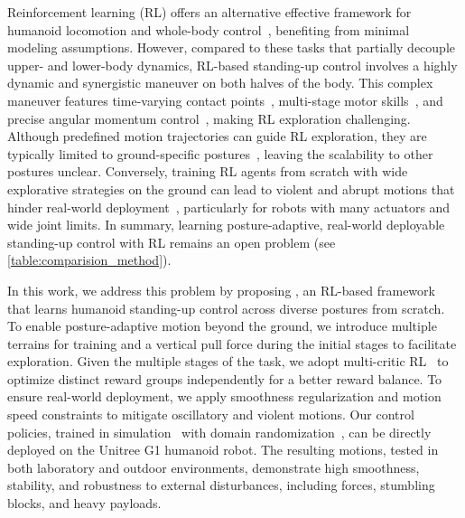 Reinforcement learning (RL) offers an alternative effective framework for humanoid locomotion and whole-body control~\cite{Peng2022ASE,He2024OmniH2OUA,Cheng2024ExpressiveWC,Zhang2024WoCoCoLW}, benefiting from minimal modeling assumptions. However, compared to these tasks that partially decouple upper- and lower-body dynamics, RL-based standing-up control involves a highly dynamic and synergistic maneuver on both halves of the body. This complex maneuver features time-varying contact points~\cite{kanehiro2003first}, multi-stage motor skills~\cite{luo2014multi}, and precise angular momentum control~\cite{Goswami2004RateOC}, making RL exploration challenging. Although predefined motion trajectories can guide RL exploration, they are typically limited to ground-specific postures~\cite{peng2018deepmimic,Peng2022ASE,yang2023learning,haarnoja2024learning}, leaving the scalability to other postures unclear. Conversely, training RL agents from scratch with wide explorative strategies on the ground can lead to violent and abrupt motions that hinder real-world deployment~\cite{tao2022learning}, particularly for robots with many actuators and wide joint limits. In summary, learning posture-adaptive, real-world deployable standing-up control with RL remains an open problem (see \cref{table:comparision_method}).

In this work, we address this problem by proposing \ours, an RL-based framework that learns humanoid standing-up control across diverse postures from scratch. To enable posture-adaptive motion beyond the ground, we introduce multiple terrains for training and a vertical pull force during the initial stages to facilitate exploration. Given the multiple stages of the task, we adopt multi-critic RL~\cite{mysore2022multi} to optimize distinct reward groups independently for a better reward balance. To ensure real-world deployment, we apply smoothness regularization and motion speed constraints to mitigate oscillatory and violent motions. Our control policies, trained in simulation~\cite{makoviychuk2021isaac} with domain randomization~\cite{tobin2017domain}, can be directly deployed on the Unitree G1 humanoid robot. The resulting motions, tested in both laboratory and outdoor environments, demonstrate high smoothness, stability, and robustness to external disturbances, including forces, stumbling blocks, and heavy payloads. 

